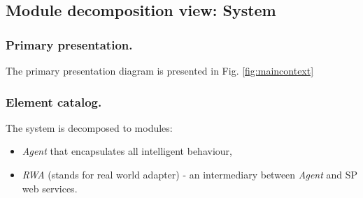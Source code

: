 \documentclass{llncs}
\begin{document}

\subsection{Module decomposition view: System}
\label{sec:module-decomposition}
\subsubsection{Primary presentation.} The primary presentation diagram is presented in Fig. \ref{fig:maincontext}

\subsubsection{Element catalog.} The system is decomposed to modules:
\begin{itemize}
	\item \emph{Agent} that encapsulates all intelligent behaviour,
	\item \emph{RWA} (stands for real world adapter) - an intermediary between \emph{Agent} and \gls{SP} web services.
\end{itemize}
\end{document}
